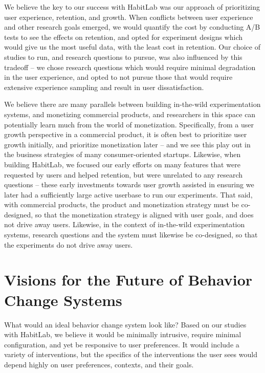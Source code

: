 We believe the key to our success with HabitLab was our approach of prioritizing user experience, retention, and growth. When conflicts between user experience and other research goals emerged, we would quantify the cost by conducting A/B tests to see the effects on retention, and opted for experiment designs which would give us the most useful data, with the least cost in retention. Our choice of studies to run, and research questions to pursue, was also influenced by this tradeoff -- we chose research questions which would require minimal degradation in the user experience, and opted to not pursue those that would require extensive experience sampling and result in user dissatisfaction.

We believe there are many parallels between building in-the-wild experimentation systems, and monetizing commercial products, and researchers in this space can potentially learn much from the world of monetization. Specifically, from a user growth perspective in a commercial product, it is often best to prioritize user growth initially, and prioritize monetization later -- and we see this play out in the business strategies of many consumer-oriented startups. Likewise, when building HabitLab, we focused our early efforts on many features that were requested by users and helped retention, but were unrelated to any research questions -- these early investments towards user growth assisted in ensuring we later had a sufficiently large active userbase to run our experiments. That said, with commercial products, the product and monetization strategy must be co-designed, so that the monetization strategy is aligned with user goals, and does not drive away users. Likewise, in the context of in-the-wild experimentation systems, research questions and the system must likewise be co-designed, so that the experiments do not drive away users.

\section{Visions for the Future of Behavior Change Systems}

What would an ideal behavior change system look like? Based on our studies with HabitLab, we believe it would be minimally intrusive, require minimal configuration, and yet be responsive to user preferences. It would include a variety of interventions, but the specifics of the interventions the user sees would depend highly on user preferences, contexts, and their goals.

